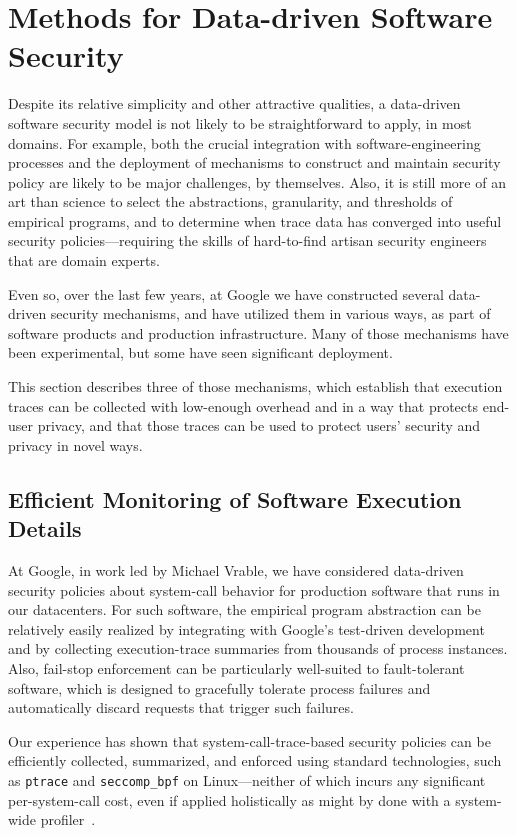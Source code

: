 \documentclass{IEEEtran}
\begin{document}
\section{Methods for Data-driven Software Security}
Despite its relative simplicity and other attractive qualities,
a data-driven software security model 
is not likely to be straightforward to apply, in most domains.
For example,
both
the crucial integration with software-engineering processes
and the
deployment of mechanisms to construct and maintain security policy
are likely to be major challenges, by themselves.
Also, 
it is still more of an art than science to
select the abstractions, granularity, and thresholds of empirical programs,
and to determine when trace data has converged into useful security policies---requiring 
the skills of hard-to-find artisan security engineers
that are domain experts.


Even so,
over the last few years,
at Google
we have constructed
several data-driven security mechanisms, and have utilized them in various ways,
as part of software products and production infrastructure.
Many of those mechanisms have been experimental, but some have seen significant deployment.

This section describes three of those mechanisms,
which establish that
execution traces can be collected
with low-enough overhead and in a way that protects end-user privacy,
and that those traces can be used to protect users' security and privacy in novel ways.


\subsection{Efficient Monitoring of Software Execution Details}
At Google, 
in work led by Michael Vrable,
we have considered 
data-driven security policies about system-call behavior
for production software that runs in our datacenters.
For such software, the empirical program abstraction can 
be relatively easily realized
by integrating with Google's test-driven development
and by collecting execution-trace summaries 
from thousands of process instances.
Also,
fail-stop enforcement can be particularly 
well-suited to fault-tolerant software,
which is designed to gracefully tolerate process failures
and automatically discard requests that trigger such failures.


Our experience has shown that system-call-trace-based security policies
can be efficiently collected, summarized, and enforced
using standard technologies,
such as \texttt{ptrace} and \texttt{seccomp\_bpf} on Linux---neither
of which incurs any significant per-system-call cost,
even if applied holistically as might by done with a system-wide profiler~\cite{DCPI}. 
\end{document}
